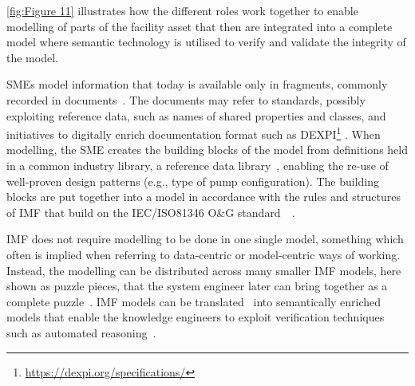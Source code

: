 \documentclass[../main.tex]{subfiles}
\begin{document}
\autoref{fig:Figure 11} illustrates how the different roles work together to enable modelling of parts of the facility asset that
then are integrated into a complete model where semantic technology is utilised to verify and validate the integrity
of the model.


SMEs model information that today is available only in fragments, commonly recorded in documents~.  The documents
may refer to standards, possibly exploiting reference data, such as names of shared properties and classes, and
initiatives to digitally enrich documentation format such as DEXPI\footnote{\url{https://dexpi.org/specifications/}}
.  When modelling, the SME creates the building blocks of the model from definitions held in a common
industry library, a reference data library~, enabling the re-use of well-proven design patterns (e.g., type
of pump configuration). The building blocks are put together into a model in accordance with the rules and
structures of IMF that build on the IEC/ISO81346 O\&G standard~\cite{81346-OG}~.

IMF does not require modelling to be done in one single model, something which often is implied when referring to data-centric
or model-centric ways of working. Instead, the modelling can be distributed across many smaller IMF models, here shown as puzzle
pieces, that the system engineer later can bring together as a complete puzzle~. IMF models can be
translated~ into semantically enriched models that enable the knowledge engineers to exploit verification techniques such as automated
reasoning~.

%
\end{document}

